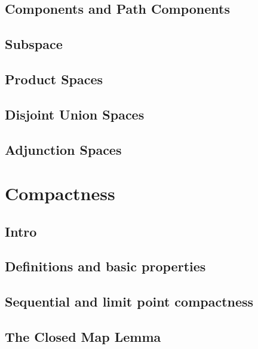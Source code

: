 \subsection{Components and Path Components}
\label{subsection-component-and-path-components}

\subsection{Subspace}
\label{subsection-subspace}

\subsection{Product Spaces}
\label{subsection-product-spaces}

\subsection{Disjoint Union Spaces}
\label{subsection-disjoint-union-spaces}

\subsection{Adjunction Spaces}
\label{subsection-adjunction-spaces}

\section{Compactness}
\label{section-compactness}

\subsection{Intro}
\label{subsection-compactness-intro}

\subsection{Definitions and basic properties}
\label{subsection-compactness-definitions-and-basic-properties}

\subsection{Sequential and limit point compactness}
\label{subsection-sequential-and-limit-point-compactness}

\subsection{The Closed Map Lemma}
\label{subsection-the-closed-map-lemma}

